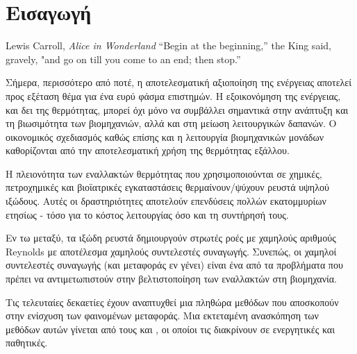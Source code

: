 
\chapter{Εισαγωγή}  %

\ifpdf
    \graphicspath{{Chapter1/Figs/Raster/}{Chapter1/Figs/PDF/}{Chapter1/Figs/}}
\else
    \graphicspath{{Chapter1/Figs/Vector/}{Chapter1/Figs/}}
\fi



\begin{chapquote}{Lewis Carroll, \textit{Alice in Wonderland}}
“Begin at the beginning,'' the King said, gravely, "and go on till you
come to an end; then stop.”
\end{chapquote}



\noindent Σήμερα, περισσότερο από ποτέ, η αποτελεσματική αξιοποίηση της ενέργειας αποτελεί προς εξέταση θέμα για ένα ευρύ φάσμα επιστημών. H εξοικονόμηση της ενέργειας, και δει της θερμότητας, μπορεί όχι μόνο να συμβάλλει σημαντικά στην ανάπτυξη και τη βιωσιμότητα των βιομηχανιών, αλλά και στη μείωση λειτουργικών δαπανών. Ο οικονομικός σχεδιασμός καθώς επίσης και η λειτουργία βιομηχανικών μονάδων καθορίζονται από την αποτελεσματική χρήση της θερμότητας εξάλλου.

Η πλειονότητα των εναλλακτών θερμότητας που χρησιμοποιούνται σε χημικές, πετροχημικές και βιοϊατρικές εγκαταστάσεις θερμαίνουν/ψύχουν ρευστά υψηλού ιξώδους. Αυτές οι δραστηριότητες αποτελούν επενδύσεις πολλών εκατομμυρίων ετησίως - τόσο για το κόστος λειτουργίας όσο και τη συντήρησή τους.

Εν τω μεταξύ, τα ιξώδη ρευστά δημιουργούν στρωτές ροές με χαμηλούς αριθμούς Reynolds με αποτέλεσμα χαμηλούς συντελεστές συναγωγής. Συνεπώς, οι χαμηλοί συντελεστές συναγωγής (και μεταφοράς εν γένει) είναι ένα από τα προβλήματα που πρέπει να αντιμετωπιστούν στην βελτιστοποίηση των εναλλακτών στη βιομηχανία.

Τις τελευταίες δεκαετίες έχουν αναπτυχθεί μια πληθώρα μεθόδων που αποσκοπούν στην ενίσχυση των φαινομένων μεταφοράς. Μια εκτεταμένη ανασκόπηση των μεθόδων αυτών γίνεται από τους \citeauthor{1991_Bergles_BOOK_CHAPTER} \cite{1991_Bergles_BOOK_CHAPTER} και \citeauthor{2005_Webb_BOOK} \cite{2005_Webb_BOOK}, οι οποίοι τις διακρίνουν σε ενεργητικές και παθητικές.

